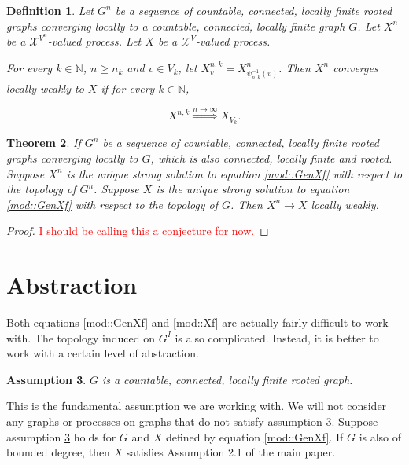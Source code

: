 \documentclass[12pt]{article}
\newcommand{\mb}{\mathbb}
\newcommand{\mc}{\mathcal}
\newcommand{\ra}{\rightarrow}
\newcommand{\os}{\overset}
\newcommand{\tr}{\textcolor{red}}
\newcommand{\ind}{\hspace{24pt}}
\newcommand{\sta}{\mc{X}}							%
\newcommand{\Xf}{X}									%
\newcommand{\inter}[1]{#1^I}
\newtheorem{thms}{Theorem}[section]
\newtheorem{defn}[thms]{Definition}
\newtheorem{assu}[thms]{Assumption}
\begin{document}
\begin{defn}
Let \(G^n\) be a sequence of countable, connected, locally finite rooted graphs converging locally to a countable, connected, locally finite graph \(G\). Let \(\Xf^n\) be a \(\sta^{V^n}\)-valued process. Let \(\Xf\) be a \(\sta^V\)-valued process. 

\ind For every \(k\in \mb{N}\), \(n \geq n_k\) and \(v \in V_k\), let \(\Xf^{n,k}_v = \Xf^n_{\psi_{n,k}^{-1}(v)}\). Then \(\Xf^n\) converges locally weakly to \(\Xf\) if for every \(k \in \mb{N}\),

\[\Xf^{n,k} \os{n\ra\infty}{\Rightarrow} \Xf_{V_k}.\]
\label{mod::locweak}
\end{defn}

\begin{thms}
If \(G^n\) be a sequence of countable, connected, locally finite rooted graphs converging locally to \(G\), which is also connected, locally finite and rooted. Suppose \(\Xf^n\) is the unique strong solution to equation \eqref{mod::GenXf} with respect to the topology of \(G^n\). Suppose \(\Xf\) is the unique strong solution to equation \eqref{mod::GenXf} with respect to the topology of \(G\). Then \(\Xf^n \ra \Xf\) locally weakly.
\label{lblocweak}
\end{thms}
\begin{proof}
\tr{I should be calling this a conjecture for now.}
\end{proof}

\section{Abstraction}
\label{abs}

Both equations \eqref{mod::GenXf} and \eqref{mod::Xf} are actually fairly difficult to work with. The topology induced on \(\inter{G}\) is also complicated. Instead, it is better to work with a certain level of abstraction.

\begin{assu}
\(G\) is a countable, connected, locally finite rooted graph.
\label{abs::basics}
\end{assu}

This is the fundamental assumption we are working with. We will not consider any graphs or processes on graphs that do not satisfy assumption \ref{abs::basics}. Suppose assumption \ref{abs::basics} holds for \(G\) and \(\Xf\) defined by equation \eqref{mod::GenXf}. If \(G\) is also of bounded degree, then \(\Xf\) satisfies Assumption 2.1 of the main paper. 
\end{document}
